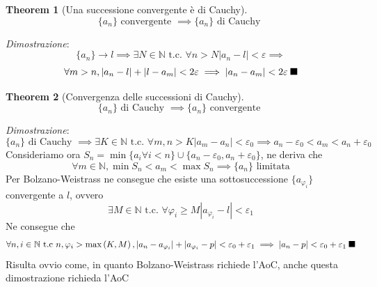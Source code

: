 \documentclass{article}
\newtheorem{theorem}{Theorem}[section]
\newcommand{\qed}{\rule{0.7em}{0.7em}}
\begin{document}
        \begin{theorem}[Una successione convergente è di Cauchy]
            $$\{a_n\} \textrm{ convergente } \implies \{a_n\} \textrm{ di Cauchy }$$
        \end{theorem}
        \textit{Dimostrazione}: \\
        $$\{a_n\} \to l \implies \exists N \in \mathbb{N} \textrm{ t.c. } \forall n > N |a_n - l| < \varepsilon \implies $$
        $$ \forall m > n, |a_n - l| + |l - a_m| < 2\varepsilon \implies |a_n - a_m| < 2\varepsilon \; \qed$$
        \begin{theorem}[Convergenza delle successioni di Cauchy]
            $$\{a_n\} \textrm{ di Cauchy } \implies \{a_n\} \textrm{ convergente }$$
        \end{theorem}
        \textit{Dimostrazione}:\\
        $$\{a_n\} \textrm{ di Cauchy } \implies \exists K \in \mathbb{N} \textrm{ t.c. } \forall m, n > K |a_m - a_n| < \varepsilon_0 \implies a_n - \varepsilon_0 < a_m < a_n + \varepsilon_0$$
        Consideriamo ora $S_n = \min\{a_i \forall i < n\} \cup \{a_n - \varepsilon_0, a_n + \varepsilon_0\}$, ne deriva che
        $$\forall m \in \mathbb{N}, \min S_n < a_m < \max S_n \implies \{a_n\} \textrm{ limitata}$$
        Per Bolzano-Weistrass ne consegue che esiste una sottosuccessione $\{a_{\varphi_i}\}$ convergente a $l$, ovvero 
        $$\exists M \in \mathbb{N} \textrm{ t.c. } \forall \varphi_i \geq M |a_{\varphi_i} - l| < \varepsilon_1$$ 
        Ne consegue che
        $$\forall n, i \in \mathbb{N} \textrm{ t.c } n, \varphi_i >  \max\left(K, M\right),
            |a_n - a_{\varphi_i}| + |a_{\varphi_i} - p| < \varepsilon_0 + \varepsilon_1 \implies |a_n - p| < \varepsilon_0 + \varepsilon_1 \; \qed$$  
        Risulta ovvio come, in quanto Bolzano-Weistrass richiede l'AoC, anche questa dimostrazione richieda l'AoC
\end{document}
